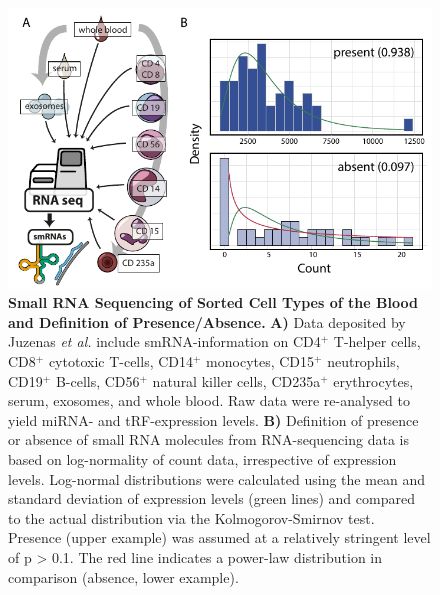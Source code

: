 \begin{method}
\begin{figure}
\centering
\includegraphics[width=.7\textwidth]{figures/celltype-presence}
\caption[Small RNA Sequencing of Sorted Cell Types of the Blood and Definition of Presence/Absence.]{\textbf{Small RNA Sequencing of Sorted Cell Types of the Blood and Definition of Presence/Absence.} \textbf{A)} Data deposited by Juzenas \emph{et al.}\cite{Juzenas2017} include smRNA-information on CD4$^+$ T-helper cells, CD8$^+$ cytotoxic T-cells, CD14$^+$ monocytes, CD15$^+$ neutrophils, CD19$^+$ B-cells, CD56$^+$ natural killer cells, CD235a$^+$ erythrocytes, serum, exosomes, and whole blood. Raw data were re-analysed to yield miRNA- and tRF-expression levels. \textbf{B)} Definition of presence or absence of small RNA molecules from RNA-sequencing data is based on log-normality of count data, irrespective of expression levels. Log-normal distributions were calculated using the mean and standard deviation of expression levels (green lines) and compared to the actual distribution via the Kolmogorov-Smirnov test. Presence (upper example) was assumed at a relatively stringent level of p > 0.1. The red line indicates a power-law distribution in comparison (absence, lower example).
\label{fig:celltype-presence}}
\end{figure}


\end{method}
